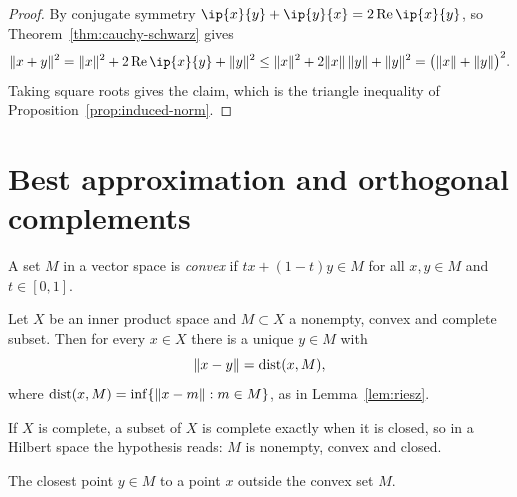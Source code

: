 \begin{proof}
By conjugate symmetry $\ip{x}{y} + \ip{y}{x} = 2 \operatorname{Re}\ip{x}{y}$,
so Theorem~\ref{thm:cauchy-schwarz} gives
\[
  \norm{x + y}^2 = \norm{x}^2 + 2\operatorname{Re}\ip{x}{y} + \norm{y}^2
  \le \norm{x}^2 + 2\norm{x}\,\norm{y} + \norm{y}^2
  = \bigl(\norm{x} + \norm{y}\bigr)^2 .
\]
Taking square roots gives the claim, which is the triangle inequality of
Proposition~\ref{prop:induced-norm}.
\end{proof}

\section{Best approximation and orthogonal complements}

\begin{definition}\label{def:convex}
A set $M$ in a vector space is \emph{convex} if $t x + (1-t) y \in M$ for all
$x, y \in M$ and $t \in [0,1]$.
\end{definition}

\begin{theorem}\label{thm:minimizing}
Let $X$ be an inner product space and $M \subset X$ a nonempty, convex and
complete subset. Then for every $x \in X$ there is a unique $y \in M$ with
\[
  \lVert x - y\rVert = \operatorname{dist}(x, M) ,
\]
where $\operatorname{dist}(x, M) = \inf\{\lVert x - m\rVert : m \in M\}$, as in
Lemma~\ref{lem:riesz}.
\end{theorem}

\begin{remark}\label{rem:minimizing-closed}
If $X$ is complete, a subset of $X$ is complete exactly when it is closed, so
in a Hilbert space the hypothesis reads: $M$ is nonempty, convex and closed.
\end{remark}

\begin{nfigure}{The closest point $y \in M$ to a point $x$ outside the convex
set $M$.}
\end{nfigure}

